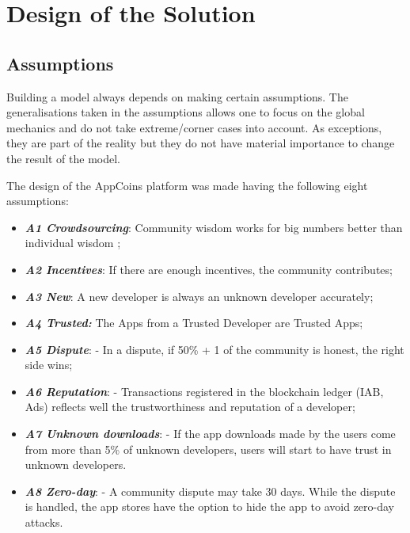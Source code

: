 \section{Design of the Solution}

\label{sec:design}

\subsection{Assumptions}


Building a model always depends on making certain assumptions. The generalisations taken in the 
assumptions allows one to focus on the global mechanics and do not take extreme/corner cases into account. 
As exceptions, they are part of the reality but they do not have material importance to change the result 
of the model.

\medskip

The design of the AppCoins platform was made having the following eight assumptions:

\begin{itemize}
\item {\bf\em A1 Crowdsourcing}: Community wisdom works for big numbers better than individual 
wisdom \cite{Surowiecki:2005:WC:1095645};
\item {\bf\em A2 Incentives}: If there are enough incentives, the community contributes;
\item {\bf\em A3 New}: A new developer is always an unknown developer accurately;
\item {\bf\em A4 Trusted:} The Apps from a Trusted Developer are Trusted Apps;
\item {\bf\em A5 Dispute}: - In a dispute, if 50\% + 1 of the community is honest, the right side wins;
\item {\bf\em A6 Reputation}: - Transactions registered in the blockchain ledger (IAB, Ads) reflects well 
the trustworthiness and reputation of a developer;
\item {\bf\em A7 Unknown downloads}: - If the app downloads made by the users come from more than 
5\% of unknown developers, users will start to have trust in unknown developers.
\item {\bf\em A8 Zero-day}: - A community dispute may take 30 days. While the dispute is handled, the 
app stores have the option to hide the app to avoid zero-day attacks.
\end{itemize}


